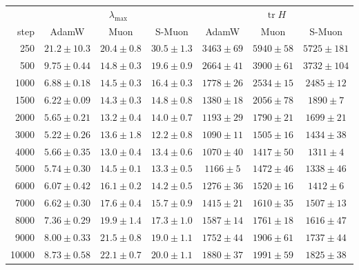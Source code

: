 \begin{center}\small
\captionsetup{type=table}
\caption{Curvature over training: top Hessian eigenvalue $\lambda_{\max}$ and Hessian trace $\operatorname{tr}H$ at fixed
steps, mean $\pm$ half-range over data orders 0--2.}
\label{tab:app-curv}
\footnotesize\setlength{\tabcolsep}{4pt}
\begin{tabular}{@{}r|ccc|ccc@{}}
 & \multicolumn{3}{c|}{$\lambda_{\max}$} & \multicolumn{3}{c}{$\operatorname{tr}H$} \\
step & AdamW & Muon & S-Muon & AdamW & Muon & S-Muon \\
\hline
250 & $21.2 \pm 10.3$ & $20.4 \pm 0.8$ & $30.5 \pm 1.3$ & $3463 \pm 69$ & $5940 \pm 58$ & $5725 \pm 181$ \\
500 & $9.75 \pm 0.44$ & $14.8 \pm 0.3$ & $19.6 \pm 0.9$ & $2664 \pm 41$ & $3900 \pm 61$ & $3732 \pm 104$ \\
1000 & $6.88 \pm 0.18$ & $14.5 \pm 0.3$ & $16.4 \pm 0.3$ & $1778 \pm 26$ & $2534 \pm 15$ & $2485 \pm 12$ \\
1500 & $6.22 \pm 0.09$ & $14.3 \pm 0.3$ & $14.8 \pm 0.8$ & $1380 \pm 18$ & $2056 \pm 78$ & $1890 \pm 7$ \\
2000 & $5.65 \pm 0.21$ & $13.2 \pm 0.4$ & $14.0 \pm 0.7$ & $1193 \pm 29$ & $1790 \pm 21$ & $1699 \pm 21$ \\
3000 & $5.22 \pm 0.26$ & $13.6 \pm 1.8$ & $12.2 \pm 0.8$ & $1090 \pm 11$ & $1505 \pm 16$ & $1434 \pm 38$ \\
4000 & $5.66 \pm 0.35$ & $13.0 \pm 0.4$ & $13.4 \pm 0.6$ & $1070 \pm 40$ & $1417 \pm 50$ & $1311 \pm 4$ \\
5000 & $5.74 \pm 0.30$ & $14.5 \pm 0.1$ & $13.3 \pm 0.5$ & $1166 \pm 5$ & $1472 \pm 46$ & $1338 \pm 46$ \\
6000 & $6.07 \pm 0.42$ & $16.1 \pm 0.2$ & $14.2 \pm 0.5$ & $1276 \pm 36$ & $1520 \pm 16$ & $1412 \pm 6$ \\
7000 & $6.62 \pm 0.30$ & $17.6 \pm 0.4$ & $15.7 \pm 0.9$ & $1415 \pm 21$ & $1610 \pm 35$ & $1507 \pm 13$ \\
8000 & $7.36 \pm 0.29$ & $19.9 \pm 1.4$ & $17.3 \pm 1.0$ & $1587 \pm 14$ & $1761 \pm 18$ & $1616 \pm 47$ \\
9000 & $8.00 \pm 0.33$ & $21.5 \pm 0.8$ & $19.0 \pm 1.1$ & $1752 \pm 44$ & $1906 \pm 61$ & $1737 \pm 44$ \\
10000 & $8.73 \pm 0.58$ & $22.1 \pm 0.7$ & $20.0 \pm 1.1$ & $1880 \pm 37$ & $1991 \pm 59$ & $1825 \pm 38$ \\
\hline
\end{tabular}
\end{center}

